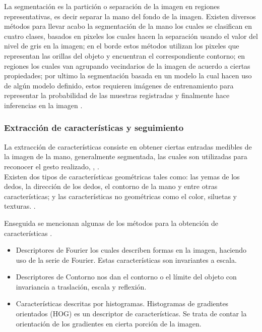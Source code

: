 La segmentación es la partición o separación de la imagen en regiones representativas, es decir separar la mano del fondo de la imagen. Existen diversos métodos para llevar acabo la segmentación de la mano los cuales se clasifican en cuatro clases, basados en pixeles los cuales hacen la separación usando el valor del nivel de gris en la imagen; en el borde estos métodos utilizan los pixeles que representan las orillas del objeto y encuentran el correspondiente contorno; en regiones los cuales van agrupando vecindarios de la imagen de acuerdo a ciertas propiedades; por ultimo la segmentación basada en un modelo la cual hacen uso de algún modelo definido, estos requieren imágenes de entrenamiento para representar la probabilidad de las muestras registradas y finalmente hace inferencias en la imagen \citep{Ibraheem2013}.

\subsubsection{Extracción de características y seguimiento}\label{sssec:EtapaSeguimiento}  

La extracción de características consiste en obtener ciertas entradas medibles de la imagen de la mano, generalmente segmentada, las cuales son utilizadas para reconocer el gesto realizado, \citep{Premaratne2013}, \citep{Nayakwadi2014}.\\
Existen dos tipos de características geométricas tales como: las yemas de los dedos, la dirección de los dedos, el contorno de la mano y entre otras características; y las características no geométricas como el color, siluetas y texturas. \citep{Murthy2009}. 

Enseguida se mencionan algunas de los métodos para la obtención de características \citep{Premaratne2013}. 
\begin{itemize}
\item Descriptores de Fourier los cuales describen formas en la imagen, haciendo uso de la serie de Fourier. Estas características son invariantes a escala.
\item Descriptores de Contorno nos dan el contorno  o el límite del objeto con invariancia a traslación, escala  y reflexión.     
\item Características descritas por histogramas. Histogramas de gradientes orientados (HOG) es un descriptor de características. Se trata de contar la orientación de los gradientes en cierta porción de la imagen.  
\end{itemize}


